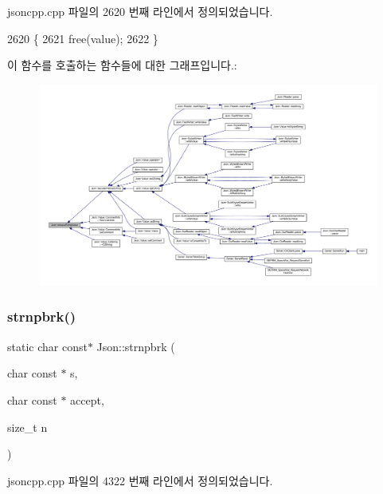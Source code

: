 jsoncpp.\+cpp 파일의 2620 번째 라인에서 정의되었습니다.


\begin{DoxyCode}
2620                                                              \{
2621   free(value);
2622 \}
\end{DoxyCode}
이 함수를 호출하는 함수들에 대한 그래프입니다.\+:
\nopagebreak
\begin{figure}[H]
\begin{center}
\leavevmode
\includegraphics[width=350pt]{namespace_json_a3e0d81d514d0e8bddf33b08074214abd_icgraph}
\end{center}
\end{figure}
\mbox{\label{namespace_json_a7492156d0c7d2dd2f672acacfb240320}} 
\subsubsection{\texorpdfstring{strnpbrk()}{strnpbrk()}}
{\footnotesize\ttfamily static char const$\ast$ Json\+::strnpbrk (\begin{DoxyParamCaption}\item[{char const $\ast$}]{s,  }\item[{char const $\ast$}]{accept,  }\item[{size\+\_\+t}]{n }\end{DoxyParamCaption})\hspace{0.3cm}{\ttfamily [static]}}



jsoncpp.\+cpp 파일의 4322 번째 라인에서 정의되었습니다.


